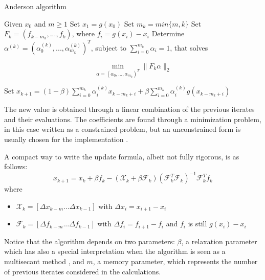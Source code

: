 \documentclass[12pt]{article}
\begin{document}
			\begin{algorithm}
				\caption{Anderson algorithm}
				\label{alg1}
			\begin{algorithmic}
				\State Given $x_0$ and $m \geq 1$
				\State Set $x_1 = g(x_0)$
				\State Set $m_k = min\{m, k\}$
				\State Set $F_k = (f_{k-m_k}, ... , f_k)$, where $f_i = g(x_i)-x_{i}$
				\State Determine $\alpha^{(k)} = (\alpha^{(k)}_0 , ..., \alpha^{(k)}_{m_k} )^T$, subject to 
				$\sum^{m_k}_{i=0} {\alpha_i = 1}$, that solves
				
				\begin{equation}
				\min_{\alpha=(\alpha_0,...,\alpha_{m_k} )^T} \|F_k \alpha\|_2
				\end{equation}
				
				\State Set $x_{k+1} = (1-\beta) \sum^{m_k}_{i=0} {\alpha_i^{(k)} x_{k-m_{k}+i}}	+\beta \sum^{m_k}_{i=0} {\alpha_i^{(k)} g(x_{k-m_{k}+i})}$   
				\EndFor
				\end{algorithmic}	
				\end{algorithm}
				
			The new value is obtained through a linear combination of the previous iterates and their evaluations.
			The coefficients are found through a minimization problem, in this case written as a constrained
			problem, but an unconstrained form is usually chosen for the implementation \cite{Fang}\cite{Walker}.
			
			A compact way to write the update formula, albeit not fully rigorous, is as follows:
			\begin{equation}
				\label{eq:2}
				x_{k+1}=x_{k} + \beta f_k -(\mathscr{X}_k + \beta \mathscr{F}_k)(\mathscr{F}_k^T \mathscr{F}_k)^{-1}\mathscr{F}_k^T f_k
			\end{equation}
			where \begin{itemize}
			\item	$\mathscr{X}_k=[\Delta x_{k-m}...\Delta x_{k-1}]$ with $\Delta x_{i}=x_{i+1}-x_i$  
			\item $\mathscr{F}_k=[\Delta f_{k-m}...\Delta f_{k-1}]$ with $\Delta f_{i}=f_{i+1}-f_i$ and $f_i$ is still $g(x_i)-x_{i}$
			\end{itemize}
			Notice that the algorithm depends on two parameters: $\beta$, a relaxation parameter which has also
			a special interpretation when the algorithm is seen as a multisecant method \cite{Fang}, and $m$,
			a memory parameter, which represents the number of previous iterates considered in the calculations.
			
\end{document}
